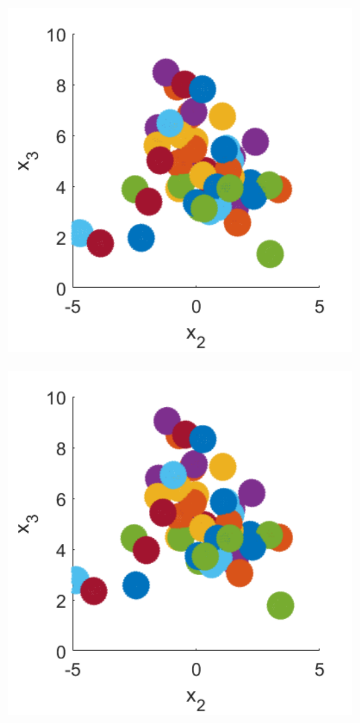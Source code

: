 \begin{figure}
\begin{subfigure}[b]{0.2\textwidth}
    \caption[]{\label{fig:squirmerPosF}}
\end{subfigure}
\begin{subfigure}[b]{0.2\textwidth}
    \centering
    \includegraphics[width=\textwidth]{Images/squirmers/Gyro-7-All.pdf}
    \caption[]{\label{fig:squirmerPosG}}
\end{subfigure}
\begin{subfigure}[b]{0.2\textwidth}
    \centering
    \includegraphics[width=\textwidth]{Images/squirmers/Gyro-8-All.pdf}

\end{subfigure}
\end{figure}

